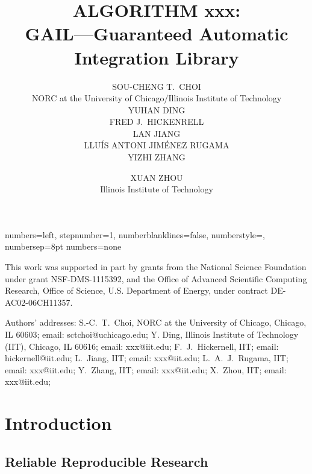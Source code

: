 \documentclass[acmtoms]{doc_acmtrans2m}
\title{ALGORITHM xxx:
      \\GAIL---Guaranteed Automatic Integration Library}
\author{SOU-CHENG T.~CHOI
     \\NORC at the University of Chicago/Illinois Institute of Technology
     \\YUHAN DING
     \\FRED J.~HICKENRELL
     \\LAN JIANG
     \\LLU\'{I}S ANTONI JIM\'{E}NEZ RUGAMA
     \\YIZHI ZHANG 
     \and XUAN ZHOU
     \\Illinois Institute of  Technology }
\begin{document}
{numbers=left, stepnumber=1, numberblanklines=false,
numberstyle=\tiny, numbersep=8pt}
{numbers=none}

\lstset{
language=[90]Fortran, %
basicstyle=\small,    %
style=numbers,        %
emptylines=*1,        %
breaklines=true,      %
escapeinside=<>,      %
framesep=2.5mm,       %
}


\begin{bottomstuff}
This work was supported in part by grants from
the National Science Foundation under grant NSF-DMS-1115392, and
the Office of Advanced Scientific Computing Research, Office of Science, 
U.S. Department of Energy, under contract DE-AC02-06CH11357. 

Authors' addresses:
%
   S.-C.~T.~Choi, NORC at the University of Chicago,
   Chicago, IL 60603; email: sctchoi@uchicago.edu;
%  
   Y. Ding, Illinois Institute of Technology (IIT),
   Chicago, IL 60616; email: xxx@iit.edu;  
%
   F.~J.~Hickernell, IIT; email: hickernell@iit.edu; 
%
   L.~Jiang, IIT; email: xxx@iit.edu; 
%
   L.~A.~J.~Rugama, IIT; email: xxx@iit.edu; 
%
   Y.~Zhang, IIT; email: xxx@iit.edu; 
%
   X.~Zhou, IIT; email: xxx@iit.edu; 
\end{bottomstuff}

\maketitle



\section{Introduction} \label{sec:intro}  


\subsection{Reliable Reproducible Research}  
\end{document}
